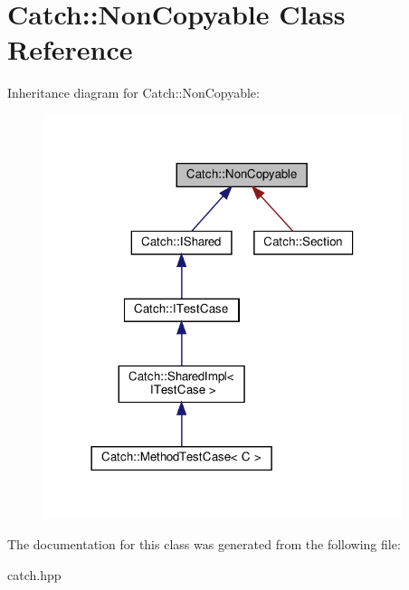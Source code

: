 \hypertarget{classCatch_1_1NonCopyable}{}\section{Catch\+:\+:Non\+Copyable Class Reference}
\label{classCatch_1_1NonCopyable}


Inheritance diagram for Catch\+:\+:Non\+Copyable\+:\nopagebreak
\begin{figure}[H]
\begin{center}
\leavevmode
\includegraphics[width=297pt]{classCatch_1_1NonCopyable__inherit__graph}
\end{center}
\end{figure}


The documentation for this class was generated from the following file\+:\begin{DoxyCompactItemize}
\item 
catch.\+hpp\end{DoxyCompactItemize}
